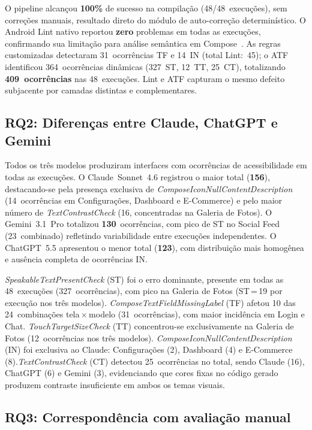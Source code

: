 \documentclass[sigconf,anonymous,review]{webmedia}
\begin{document}
O pipeline alcançou \textbf{100\%} de sucesso na compilação
(48/48~execuções), sem correções manuais, resultado direto do módulo
de auto-correção determinístico. O Android Lint nativo reportou
\textbf{zero} problemas em todas as execuções, confirmando sua
limitação para análise semântica em
Compose~\cite{google2024composeaccessibility}. As regras customizadas
detectaram 31~ocorrências TF e 14~IN (total Lint:~45); o ATF
identificou 364~ocorrências dinâmicas (327~ST, 12~TT, 25~CT),
totalizando \textbf{409~ocorrências} nas 48~execuções. Lint e ATF
capturam o mesmo defeito subjacente por camadas distintas e
complementares.

\subsection{RQ2: Diferenças entre Claude, ChatGPT e Gemini}

Todos os três modelos produziram interfaces com ocorrências de
acessibilidade em todas as execuções. O Claude~Sonnet~4.6 registrou
o maior total (\textbf{156}), destacando-se pela presença exclusiva
de \textit{ComposeIconNullContentDescription} (14~ocorrências em
Configurações, Dashboard e E-Commerce) e pelo maior número de
\textit{TextContrastCheck} (16, concentradas na Galeria de Fotos).
O Gemini~3.1~Pro totalizou \textbf{130}~ocorrências, com pico de
ST no Social Feed (23~combinado) refletindo variabilidade entre
execuções independentes. O ChatGPT~5.5 apresentou o menor total
(\textbf{123}), com distribuição mais homogênea e ausência completa
de ocorrências IN.

\textit{SpeakableTextPresentCheck} (ST) foi o erro dominante,
presente em todas as 48~execuções (327~ocorrências), com pico na
Galeria de Fotos (ST\,=\,19 por execução nos três modelos).
\textit{ComposeTextFieldMissingLabel} (TF) afetou 10 das
24~combinações tela\,$\times$\,modelo (31~ocorrências), com maior
incidência em Login e Chat. \textit{TouchTargetSizeCheck} (TT)
concentrou-se exclusivamente na Galeria de Fotos (12~ocorrências nos
três modelos). \textit{ComposeIconNullContentDescription} (IN) foi
exclusiva ao Claude: Configurações (2), Dashboard (4) e E-Commerce
(8).\textit{TextContrastCheck} (CT) detectou 25~ocorrências no total,
sendo Claude (16), ChatGPT (6) e Gemini (3), evidenciando que cores
fixas no código gerado produzem contraste insuficiente em ambos os
temas visuais.

\subsection{RQ3: Correspondência com avaliação manual}
\end{document}
